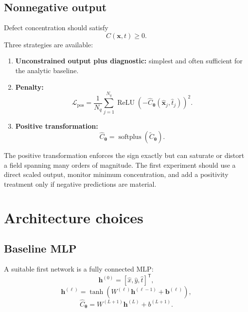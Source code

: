 \documentclass[11pt]{article}
\newcommand{\thetav}{\bm{\theta}}
\newcommand{\xv}{\bm{x}}
\newcommand{\Lpos}{\mathcal{L}_{\mathrm{{pos}}}}
\newcommand{\softplus}{\operatorname{softplus}}
\newcommand{\relu}{\operatorname{ReLU}}
\begin{document}
\subsection{Nonnegative output}

Defect concentration should satisfy
\begin{equation}
C(\xv,t)\ge0.
\end{equation}
Three strategies are available:
\begin{enumerate}[label=\arabic*.]
    \item \textbf{Unconstrained output plus diagnostic:} simplest and often sufficient for the analytic baseline.
    \item \textbf{Penalty:}
    \begin{equation}
    \Lpos
    =
    \frac{1}{N_q}
    \sum_{j=1}^{N_q}
    \relu\left(
    -\widehat{C}_{\thetav}(\hat{\xv}_j,\hat{t}_j)
    \right)^2.
    \end{equation}
    \item \textbf{Positive transformation:}
    \begin{equation}
    \widehat{C}_{\thetav}
    =
    \softplus\left(
    \widetilde{C}_{\thetav}
    \right).
    \end{equation}
\end{enumerate}

The positive transformation enforces the sign exactly but can saturate or distort a field spanning many orders of magnitude. The first experiment should use a direct scaled output, monitor minimum concentration, and add a positivity treatment only if negative predictions are material.

\section{Architecture choices}

\subsection{Baseline MLP}

A suitable first network is a fully connected MLP:
\begin{equation}
\mathbf{h}^{(0)}
=
[\hat{x},\hat{y},\hat{t}]^{\mathsf T},
\end{equation}
\begin{equation}
\mathbf{h}^{(\ell)}
=
\tanh\left(
W^{(\ell)}\mathbf{h}^{(\ell-1)}
+\mathbf{b}^{(\ell)}
\right),
\end{equation}
\begin{equation}
\widehat{C}_{\thetav}
=
W^{(L+1)}\mathbf{h}^{(L)}
+b^{(L+1)}.
\end{equation}
\end{document}
